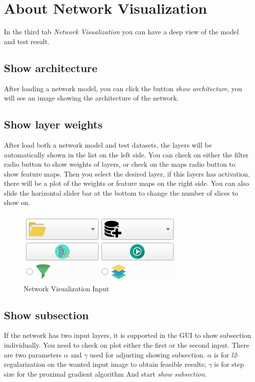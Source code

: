 \documentclass[12pt]{article}
\begin{document}
\graphicspath{ {images/} }
\section*{About Network Visualization}

In the third tab \textit{Network Visualization} you can have a deep view of the model and test result.

\subsection{Show architecture}
After loading a network model, you can click the button \textit{show architecture}, you will see an image showing the architecture of the network. 

\subsection{Show layer weights}
After load both a network model and test datasets, the layers will be automatically shown in the list on the left side. You can check on either the filter radio button to show weights of layers, or check on the maps radio button to show feature maps. Then you select the desired layer, if this layers has activation, there will be a plot of the weights or feature maps on the right side. You can also slide the horizontal slider bar at the bottom to change the number of slices to show on.
\begin{figure}[htbp]	
	\centering
	\includegraphics{visualization_in.png}
	\caption[Network Visualization Input]{Network Visualization Input}
	\label{fig:visualization_in}
\end{figure}

\subsection{Show subsection}
If the network has two input layers, it is supported in the GUI to show subsection individually. You need to check on plot either the first or the second input. There are two parameters $\alpha$ and $\gamma$ used for adjusting showing subsection. $\alpha$ is for \textit{l2}-regularization on the wanted input image to obtain feasible results; $\gamma$ is for step size for the proximal gradient algorithm  And start \textit{show subsection}.
\end{document}
